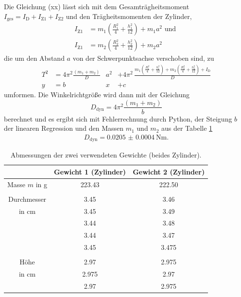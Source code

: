 Die Gleichung (xx) lässt sich mit dem Gesamträgheitsmoment $I_\text{ges} =
I_\text{D} + I_\text{Z1} + I_\text{Z2}$ und den Trägheitsmomenten der Zylinder,
\begin{align*}
  I_\text{Z1} &= m_1 \left(\frac{R_1^2}{4}+\frac{h_1^2}{12}\right)+m_1 a^2 \text{ und }\\
  I_\text{Z1} &= m_2 \left(\frac{R_2^2}{4}+\frac{h_2^2}{12}\right)+m_2 a^2
\end{align*}
die um den Abstand $a$ von der Schwerpunktsachse verschoben sind, zu
\begin{align}
  T^2 &= 4 \pi^2 \frac{(m_1 + m_2)}{D} & a^2 &+ 4 \pi^2 \, \frac{m_1\left(
  \frac{R_1^2}{4} + \frac{h_1^2}{12}\right) + m_2 \left(\frac{R_2^2}{4}
  +\frac{h_2^2}{12}\right)+ I_\text{D}}{D}\\
  y &= b & x & + c
  \label{eqn:ausgleichsrechnung}
\end{align}
umformen.
Die Winkelrichtgröße wird dann mit der Gleichung
\begin{equation}
  D_\text{dyn} = 4 \pi^2 \frac{(m_1 + m_2)}{b}
  \label{eqn:D_dyn}
\end{equation}
berechnet und es ergibt sich mit Fehlerrechnung durch Python, der Steigung $b$
der linearen Regression und den Massen $m_1$ und $m_2$ aus der Tabelle
\ref{tab:gewichte}
\begin{align*}
  D_\text{dyn} = \SI{0.0205(4)}{\newton\meter}.
\end{align*}

\begin{table}
  \centering
  \begin{tabular}{c| c c}
    \toprule
        & Gewicht 1 (Zylinder) & Gewicht 2 (Zylinder)\\
    \midrule
    Masse $m$ in \si{\gram} & 223.43 & 222.50\\
    & & \\
    Durchmesser          & 3.45 & 3.46  \\
    in \si{\centi\meter} & 3.45 & 3.49  \\
                         & 3.44 & 3.48  \\
                         & 3.44 & 3.47  \\
                         & 3.45 & 3.475 \\
    & & \\
    Höhe                 & 2.97 & 2.975 \\
    in \si{\centi\meter} & 2.975 & 2.97 \\
                         & 2.97 & 2.975 \\
    \bottomrule
  \end{tabular}
  \caption{Abmessungen der zwei verwendeten Gewichte (beides Zylinder).}
  \label{tab:gewichte}
\end{table}

